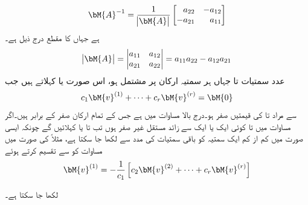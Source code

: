 \begin{align}\label{مساوات_نظام_معکوس_قالب}
\bM{A}^{-1}=\frac{1}{\abs{\bM{A}}}
\begin{bmatrix*}[r]
a_{22}& -a_{12}\\
-a_{21}& a_{11}
\end{bmatrix*}
\end{align}
ہے جہاں  کا مقطع  درج ذیل ہے۔
\begin{align}
\abs{\bM{A}}=
\begin{vmatrix*}[r]
a_{11}&a_{12}\\
a_{21}&a_{22}
\end{vmatrix*}=a_{11}a_{22}-a_{12}a_{21}
\end{align}
 عدد سمتیات  تا  جہاں ہر سمتیہ  ارکان پر مشتمل ہو، اس صورت  یا  کہلاتے ہیں جب
\begin{align}\label{مساوات_نظام_خطی-طور_غیر_تابع_قالب}
c_1\bM{v}^{(1)}+\cdots+c_r \bM{v}^{(r)}=\bM{0}
\end{align}
سے مراد   تا  کی قیمتیں صفر ہو۔درج بالا مساوات میں   ہے جس کے تمام  ارکان صفر کے برابر ہیں۔اگر مساوات  میں  تا  کوئی ایک یا ایک سے زائد مستقل غیر صفر ہوں تب  تا   یا  کہلائیں گے چونکہ ایسی صورت میں کم از کم ایک سمتیہ کو باقی سمتیات کی مدد سے لکھا جا سکتا ہے، مثلاً  کی صورت میں مساوات  کو  سے تقسیم کرتے ہوئے
\begin{align*}
\bM{v}^{(1)}=-\frac{1}{c_1}\left[c_2\bM{v}^{(2)}+\cdots+c_r \bM{v}^{(r)}\right]
\end{align*}

لکھا جا سکتا ہے۔

